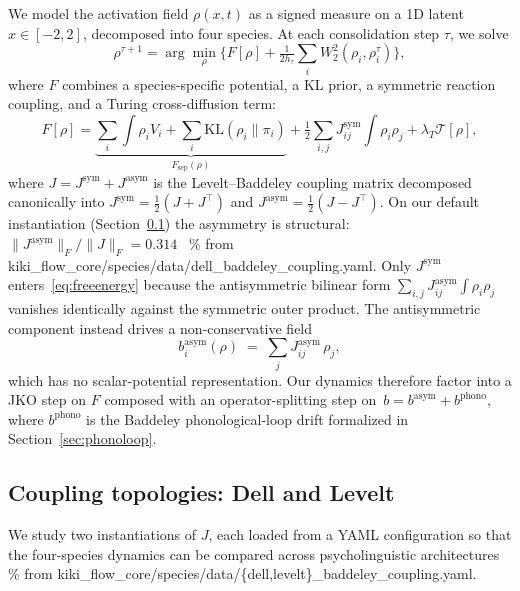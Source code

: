 \documentclass[11pt]{article}
\begin{document}
We model the activation field $\rho(x,t)$ as a signed measure on a
1D latent $x \in [-2, 2]$, decomposed into four species. At each
consolidation step $\tau$, we solve
\begin{equation}
  \rho^{\tau+1} = \arg\min_{\rho} \Big\{ F[\rho] +
      \tfrac{1}{2h_\tau} \sum_{i} W_2^2(\rho_i, \rho_i^\tau) \Big\},
  \label{eq:jko}
\end{equation}
where $F$ combines a species-specific potential, a KL prior, a
symmetric reaction coupling, and a Turing cross-diffusion term:
\begin{equation}
  F[\rho] = \underbrace{\sum_i \int \rho_i V_i
                      + \sum_i \mathrm{KL}(\rho_i \| \pi_i)}_{\displaystyle F_{\mathrm{sep}}(\rho)}
          + \tfrac{1}{2}\!\!\sum_{i,j} J^{\mathrm{sym}}_{ij} \!\!\int \rho_i \rho_j
          + \lambda_T \mathcal{T}[\rho],
  \label{eq:freeenergy}
\end{equation}
where $J = J^{\mathrm{sym}} + J^{\mathrm{asym}}$ is the Levelt--Baddeley
coupling matrix decomposed canonically into
$J^{\mathrm{sym}} = \tfrac{1}{2}(J + J^{\!\top})$ and
$J^{\mathrm{asym}} = \tfrac{1}{2}(J - J^{\!\top})$.
On our default instantiation (Section~\ref{sec:coupling}) the
asymmetry is structural:
$\|J^{\mathrm{asym}}\|_F / \|J\|_F = 0.314$~%
{\small\% from kiki\_flow\_core/species/data/dell\_baddeley\_coupling.yaml}.
Only $J^{\mathrm{sym}}$ enters~\eqref{eq:freeenergy} because the
antisymmetric bilinear form $\sum_{i,j} J^{\mathrm{asym}}_{ij}
\!\int\!\rho_i\rho_j$ vanishes identically against the symmetric outer
product. The antisymmetric component instead drives a
non-conservative field
\begin{equation}
  b^{\mathrm{asym}}_i(\rho) \;=\; \sum_j J^{\mathrm{asym}}_{ij}\,\rho_j,
  \label{eq:drift-asym}
\end{equation}
which has no scalar-potential representation. Our dynamics therefore
factor into a JKO step on $F$ composed with an operator-splitting step
on~$b = b^{\mathrm{asym}} + b^{\mathrm{phono}}$, where
$b^{\mathrm{phono}}$ is the Baddeley phonological-loop drift formalized
in Section~\ref{sec:phonoloop}.

\subsection{Coupling topologies: Dell and Levelt}
\label{sec:coupling}

We study two instantiations of $J$, each loaded from a YAML
configuration so that the four-species dynamics can be compared across
psycholinguistic architectures~%
{\small\% from kiki\_flow\_core/species/data/\{dell,levelt\}\_baddeley\_coupling.yaml}.
\end{document}
